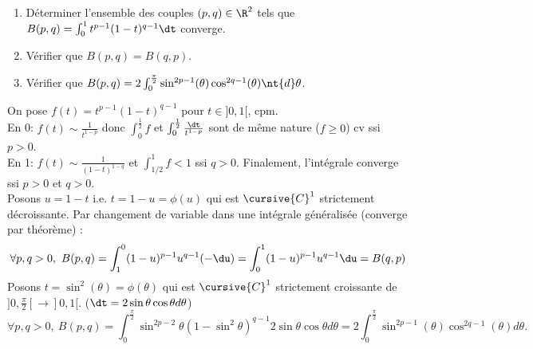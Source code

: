 \documentclass[11pt]{article}
\begin{document}
\begin{exercice}{}{}
    \begin{enumerate}
        \item Déterminer l'ensemble des couples $(p,q)\in\R^2$ tels que $B(p,q)=\int_0^1t^{p-1}(1-t)^{q-1}\dt$ converge.
        \item Vérifier que $B(p,q)=B(q,p)$.
        \item Vérifier que $B(p,q)=2\int_0^\frac{\pi}{2}\sin^{2p-1}(\theta)\cos^{2q-1}(\theta)\nt{d}\theta$.
    \end{enumerate}
    \tcblower
     On pose $f(t)=t^{p-1}(1-t)^{q-1}$ pour $t\in]0,1[$, cpm.\\
    En 0: $f(t)\sim\frac{1}{t^{1-p}}$ donc $\int_0^{\frac{1}{2}}f$ et $\int_0^{\frac{1}{2}}\frac{\dt}{t^{1-p}}$ sont de même nature ($f\geq0$) cv ssi $p>0$.\\
    En 1: $f(t)\sim\frac{1}{(1-t)^{1-q}}$ et $\int_{1/2}^{1}f<1$ ssi $q>0$. Finalement, l'intégrale converge ssi $p>0$ et $q>0$.\\
     Posons $u=1-t$ i.e. $t=1-u=\phi(u)$ qui est $\cursive{C}^1$ strictement décroissante. Par changement de variable dans une intégrale généralisée (converge par théorème) :
    \begin{equation*}
        \forall p,q>0, ~ B(p,q)=\int_1^0(1-u)^{p-1}u^{q-1}(-\du) = \int_0^1(1-u)^{p-1}u^{q-1}\du=B(q,p)
    \end{equation*}
     Posons $t=\sin^2(\theta)=\phi(\theta)$ qui est $\cursive{C}^1$ strictement croissante de $]0,\frac{\pi}{2}[\to]0,1[$. ($\dt=2\sin\theta\cos\theta d\theta$)
    \begin{equation*}
        \forall p,q>0, ~ B(p,q)=\int_0^{\frac{\pi}{2}}\sin^{2p-2}\theta(1-\sin^2\theta)^{q-1}2\sin\theta\cos\theta d\theta=2\int_0^{\frac{\pi}{2}}\sin^{2p-1}(\theta)\cos^{2q-1}(\theta)d\theta.
    \end{equation*}
\end{exercice}
\end{document}
